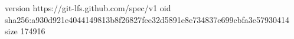 version https://git-lfs.github.com/spec/v1
oid sha256:a930d921e4044149813b8f26827fee32d5891e8e734837e699cbfa3e57930414
size 174916
